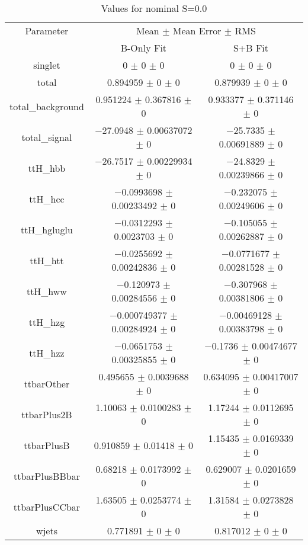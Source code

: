 \begin{table}
\centering
\caption{Values for nominal S=0.0}
\begin{tabular}{ccc}
\toprule
Parameter & \multicolumn{2}{c}{Mean $\pm$ Mean Error $\pm$ RMS}\\
 & B-Only Fit & S+B Fit\\
\midrule
singlet & \num{0} $\pm$ \num{0} $\pm$ \num{0} & \num{0} $\pm$ \num{0} $\pm$ \num{0}\\
total & \num{0.894959} $\pm$ \num{0} $\pm$ \num{0} & \num{0.879939} $\pm$ \num{0} $\pm$ \num{0}\\
total\_background & \num{0.951224} $\pm$ \num{0.367816} $\pm$ \num{0} & \num{0.933377} $\pm$ \num{0.371146} $\pm$ \num{0}\\
total\_signal & \num{-27.0948} $\pm$ \num{0.00637072} $\pm$ \num{0} & \num{-25.7335} $\pm$ \num{0.00691889} $\pm$ \num{0}\\
ttH\_hbb & \num{-26.7517} $\pm$ \num{0.00229934} $\pm$ \num{0} & \num{-24.8329} $\pm$ \num{0.00239866} $\pm$ \num{0}\\
ttH\_hcc & \num{-0.0993698} $\pm$ \num{0.00233492} $\pm$ \num{0} & \num{-0.232075} $\pm$ \num{0.00249606} $\pm$ \num{0}\\
ttH\_hgluglu & \num{-0.0312293} $\pm$ \num{0.0023703} $\pm$ \num{0} & \num{-0.105055} $\pm$ \num{0.00262887} $\pm$ \num{0}\\
ttH\_htt & \num{-0.0255692} $\pm$ \num{0.00242836} $\pm$ \num{0} & \num{-0.0771677} $\pm$ \num{0.00281528} $\pm$ \num{0}\\
ttH\_hww & \num{-0.120973} $\pm$ \num{0.00284556} $\pm$ \num{0} & \num{-0.307968} $\pm$ \num{0.00381806} $\pm$ \num{0}\\
ttH\_hzg & \num{-0.000749377} $\pm$ \num{0.00284924} $\pm$ \num{0} & \num{-0.00469128} $\pm$ \num{0.00383798} $\pm$ \num{0}\\
ttH\_hzz & \num{-0.0651753} $\pm$ \num{0.00325855} $\pm$ \num{0} & \num{-0.1736} $\pm$ \num{0.00474677} $\pm$ \num{0}\\
ttbarOther & \num{0.495655} $\pm$ \num{0.0039688} $\pm$ \num{0} & \num{0.634095} $\pm$ \num{0.00417007} $\pm$ \num{0}\\
ttbarPlus2B & \num{1.10063} $\pm$ \num{0.0100283} $\pm$ \num{0} & \num{1.17244} $\pm$ \num{0.0112695} $\pm$ \num{0}\\
ttbarPlusB & \num{0.910859} $\pm$ \num{0.01418} $\pm$ \num{0} & \num{1.15435} $\pm$ \num{0.0169339} $\pm$ \num{0}\\
ttbarPlusBBbar & \num{0.68218} $\pm$ \num{0.0173992} $\pm$ \num{0} & \num{0.629007} $\pm$ \num{0.0201659} $\pm$ \num{0}\\
ttbarPlusCCbar & \num{1.63505} $\pm$ \num{0.0253774} $\pm$ \num{0} & \num{1.31584} $\pm$ \num{0.0273828} $\pm$ \num{0}\\
wjets & \num{0.771891} $\pm$ \num{0} $\pm$ \num{0} & \num{0.817012} $\pm$ \num{0} $\pm$ \num{0}\\
\bottomrule
\end{tabular}
\end{table}